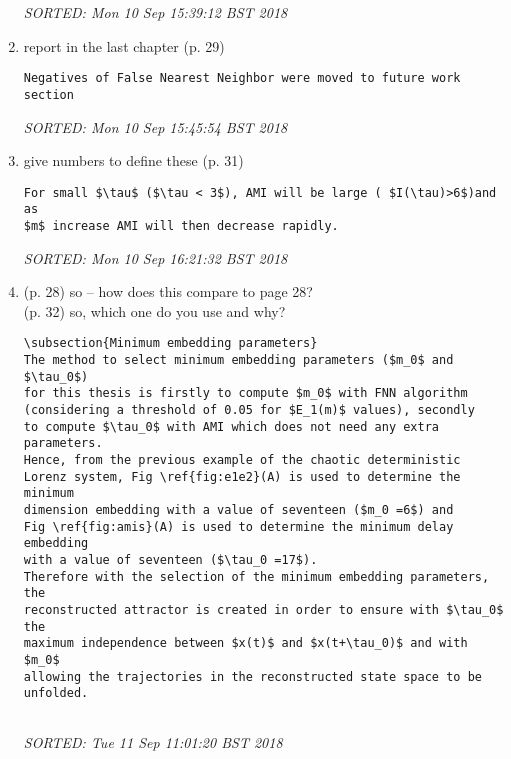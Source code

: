 \documentclass[10pt]{article}
\begin{document}
\begin{enumerate}[noitemsep,topsep=0pt]
\begin{verbatim}
\end{verbatim}
\textit{
SORTED: Mon 10 Sep 15:39:12 BST 2018
}
\\



 
\item report in the last chapter (p. 29) 
\begin{verbatim}
Negatives of False Nearest Neighbor were moved to future work section
\end{verbatim}
\textit{
SORTED: Mon 10 Sep 15:45:54 BST 2018
}
\\



\item give numbers to define these (p. 31)
\begin{verbatim}
For small $\tau$ ($\tau < 3$), AMI will be large ( $I(\tau)>6$)and as 
$m$ increase AMI will then decrease rapidly. 
\end{verbatim}
\textit{
SORTED: Mon 10 Sep 16:21:32 BST 2018
}
\\




\item (p. 28) so -- how does this compare to page 28? \\
	(p. 32) so, which one do you use and why? 


\begin{verbatim}
\subsection{Minimum embedding parameters}
The method to select minimum embedding parameters ($m_0$ and $\tau_0$) 
for this thesis is firstly to compute $m_0$ with FNN algorithm 
(considering a threshold of 0.05 for $E_1(m)$ values), secondly
to compute $\tau_0$ with AMI which does not need any extra parameters.
Hence, from the previous example of the chaotic deterministic 
Lorenz system, Fig \ref{fig:e1e2}(A) is used to determine the minimum 
dimension embedding with a value of seventeen ($m_0 =6$) and 
Fig \ref{fig:amis}(A) is used to determine the minimum delay embedding 
with a value of seventeen ($\tau_0 =17$). 
Therefore with the selection of the minimum embedding parameters, the 
reconstructed attractor is created in order to ensure with $\tau_0$ the 
maximum independence between $x(t)$ and $x(t+\tau_0)$ and with $m_0$ 
allowing the trajectories in the reconstructed state space to be unfolded.


\end{verbatim}
\textit{
SORTED: Tue 11 Sep 11:01:20 BST 2018
}
\\






\end{enumerate}
\end{document}
